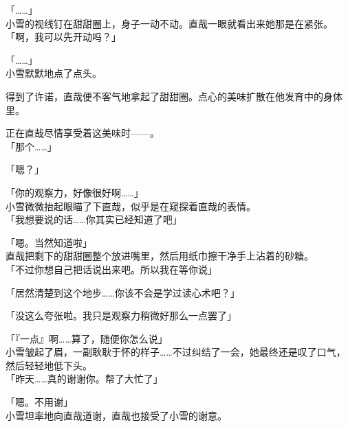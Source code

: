 「……」\\

小雪的视线钉在甜甜圈上，身子一动不动。直哉一眼就看出来她那是在紧张。\\

「啊，我可以先开动吗？」

「……」\\

小雪默默地点了点头。

得到了许诺，直哉便不客气地拿起了甜甜圈。点心的美味扩散在他发育中的身体里。

正在直哉尽情享受着这美味时——。\\

「那个……」

「嗯？」

「你的观察力，好像很好啊……」\\

小雪微微抬起眼瞄了下直哉，似乎是在窥探着直哉的表情。\\

「我想要说的话……你其实已经知道了吧」

「嗯。当然知道啦」\\

直哉把剩下的甜甜圈整个放进嘴里，然后用纸巾擦干净手上沾着的砂糖。\\

「不过你想自己把话说出来吧。所以我在等你说」

「居然清楚到这个地步……你该不会是学过读心术吧？」

「没这么夸张啦。我只是观察力稍微好那么一点罢了」

「『一点』啊……算了，随便你怎么说」\\

小雪皱起了眉，一副耿耿于怀的样子……不过纠结了一会，她最终还是叹了口气，然后轻轻地低下头。\\

「昨天……真的谢谢你。帮了大忙了」

「嗯。不用谢」\\

小雪坦率地向直哉道谢，直哉也接受了小雪的谢意。
